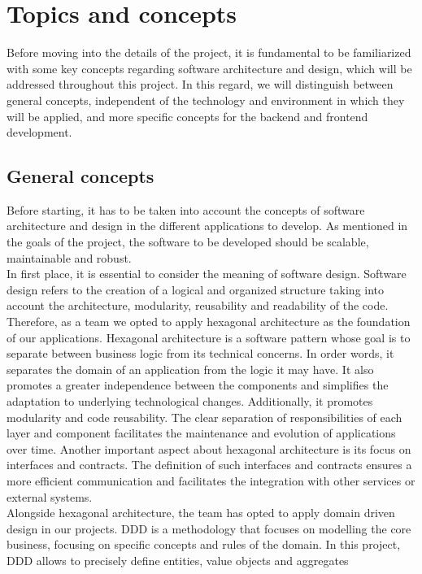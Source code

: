 \documentclass[../memory.tex]{subfiles}
\begin{document}
\section{Topics and concepts}
Before moving into the details of the project, it is fundamental to be
familiarized with some key concepts regarding software architecture and design,
which will be addressed throughout this project. In this regard, we will
distinguish between general concepts, independent of the technology and
environment in which they will be applied, and more specific concepts for the
backend and frontend development.
\subsection{General concepts}
Before starting, it has to be taken into account the concepts of software
architecture and design in the different applications to develop. As mentioned
in the goals of the project, the software to be developed should be scalable,
maintainable and robust.
\\[8pt]
In first place, it is essential to consider the meaning of software design.
Software design refers to the creation of a logical and organized structure
taking into account the architecture, modularity, reusability and readability of
the code.
\\[8pt]
Therefore, as a team we opted to apply hexagonal architecture as the foundation
of our applications. Hexagonal architecture is a software pattern whose goal is
to separate between business logic from its technical concerns. In order words, it
separates the domain of an application from the logic it may have. It also
promotes a greater independence between the components and simplifies the
adaptation to underlying technological changes. Additionally, it promotes
modularity and code reusability. The clear separation of responsibilities of
each layer and component facilitates the maintenance and evolution of
applications over time. Another important aspect about hexagonal architecture is
its focus on interfaces and contracts. The definition of such interfaces and
contracts ensures a more efficient communication and facilitates the
integration with other services or external systems.
\\
Alongside hexagonal architecture, the team has opted to apply domain driven
design in our projects. DDD is a methodology that focuses on modelling the
core business, focusing on specific concepts and rules of the domain. In this
project, DDD allows to precisely define entities, value objects and aggregates
\end{document}
